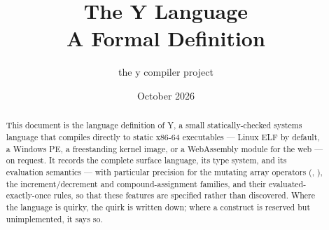 \title{The \textsf{Y} Language\\[2pt]\large A Formal Definition}
\author{the y compiler project}
\date{October 2026}

\maketitle

\begin{abstract}
This document is the language definition of \textsf{Y}, a small
statically-checked systems language that compiles directly to static
x86-64 executables --- Linux ELF by default, a Windows PE, a freestanding
kernel image, or a WebAssembly module for the web --- on request. It records the complete surface language, its type
system, and its evaluation semantics --- with particular precision for the
mutating array operators (\ic{+=}, \ic{*=}), the
increment/decrement and compound-assignment families, and their
evaluated-exactly-once rules, so that these features are specified rather
than discovered. Where the language is quirky, the quirk is written
down; where a construct is reserved but unimplemented, it says so.
\end{abstract}

\tableofcontents













